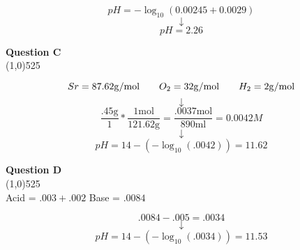 \documentclass{article}
\begin{document}
    $$pH = -\log_{10}( 0.00245 + 0.0029 )$$
    $$\downarrow$$
    $$pH = 2.26$$
    \pagebreak
    \begin{center}
        \textbf{Question C}\\
        \line(1,0){525}
    \end{center}
    $$Sr =  87.62 \si[per-mode=symbol]{\gram\per\mol} \qquad O_{2} = 32 \si[per-mode=symbol]{\gram\per\mol} \qquad H_{2} = 2\si[per-mode=symbol]{\gram\per\mol} $$
    $$\downarrow$$
    $$\dfrac{.45 \si{\gram}}{1} * \dfrac{1 \si{\mol}}{121.62 \si{\gram}} = \dfrac{.0037 \si{\mol}}{890 \si{\milli\litre}} = 0.0042 M$$
    $$\downarrow$$
    $$pH = 14 - (-\log_{10} (.0042)) = 11.62 $$
    \begin{center}
        \textbf{Question D}\\
        \line(1,0){525}\\[0.1in]
        Acid = $.003 + .002$ \qquad Base = $.0084$\\
    \end{center}
    $$ .0084 - .005 = .0034 $$
    $$ \downarrow $$
    $$pH = 14 - (-\log_{10}(.0034)) = 11.53 $$
\end{document}
